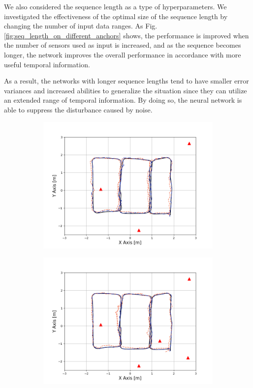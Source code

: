 \documentclass[letterpaper, 10 pt, conference]{ieeeconf}
\begin{document}
We also considered the sequence length as a type of hyperparameters. We investigated the effectiveness of the optimal size of the sequence length by changing the number of input data ranges. As Fig. \ref{fig:seq_length_on_different_anchors} shows, the performance is improved when the number of sensors used as input is increased, and as the sequence becomes longer, the network improves the overall performance in accordance with more useful temporal information.

As a result, the networks with longer sequence lengths tend to have smaller error variances and increased abilities to generalize the situation since they can utilize an extended range of temporal information. By doing so, the neural network is able to suppress the disturbance caused by noise. 

\begin{figure}[h]
	\centering
	\begin{subfigure}[b]{0.32\textwidth}
		\includegraphics[width=\textwidth]{image/trajectory_3}
		\caption{}
		\label{fig:anchor_3}
	\end{subfigure}
	\begin{subfigure}[b]{0.32\textwidth}
		\includegraphics[width=\textwidth]{image/trajectory_5}

\end{subfigure}
\end{figure}
\end{document}
